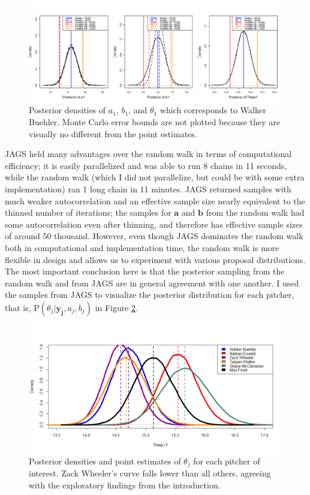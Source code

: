 \documentclass{article}
\begin{document}
\begin{figure}[h]
    \centering
    \includegraphics[scale=0.45]{figs/comp.png}
    \caption{Posterior densities of $a_1$, $b_1$, and $\theta_1$ which corresponds to Walker Buehler. Monte Carlo error bounds are not plotted because they are visually no different from the point estimates.}
    \label{fig:buehler}
\end{figure}

JAGS held many advantages over the random walk in terms of computational efficiency; it is easily parallelized and was able to run 8 chains in 11 seconds, while the random walk (which I did not parallelize, but could be with some extra implementation) ran 1 long chain in 11 minutes. JAGS returned samples with much weaker autocorrelation and an effective sample size nearly equivalent to the thinned number of iterations; the samples for $\mathbf{a}$ and $\mathbf{b}$ from the random walk had some autocorrelation even after thinning, and therefore has effective sample sizes of around 50 thousand. However, even though JAGS dominates the random walk both in computational and implementation time, the random walk is more flexible in design and allows us to experiment with various proposal distributions. The most important conclusion here is that the posterior sampling from the random walk and from JAGS are in general agreement with one another. I used the samples from JAGS to visualize the posterior distribution for each pitcher, that is, $\text{P}(\theta_j | \mathbf{y_j},a_j,b_j)$ in Figure \ref{fig:post}.

\begin{figure}[h]
    \centering
    \includegraphics[scale=0.4]{figs/posterior.png}
    \caption{Posterior densities and point estimates of $\theta_j$ for each pitcher of interest. Zack Wheeler's curve falls lower than all others, agreeing with the exploratory findings from the introduction.}
    \label{fig:post}
\end{figure}
\end{document}
